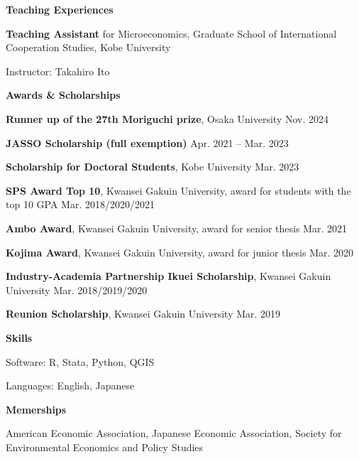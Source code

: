 \documentclass{article}
\begin{document}
\hrulefill

\begin{flushleft}
  \textbf{\large{Teaching Experiences}}
\end{flushleft}

\textbf{Teaching Assistant} for Microeconomics, Graduate School of International Cooperation Studies, Kobe University

Instructor: Takahiro Ito

\hrulefill

\begin{flushleft}
  \textbf{\large{Awards \& Scholarships}}
\end{flushleft}

\textbf{Runner up of the 27th Moriguchi prize}, Osaka University \hspace{\fill} Nov. 2024

\textbf{JASSO Scholarship (full exemption)} \hspace{\fill} Apr. 2021 -- Mar. 2023

\textbf{Scholarship for Doctoral Students}, Kobe University \hspace{\fill} Mar. 2023

\textbf{SPS Award Top 10}, Kwansei Gakuin University, award for students with the top 10 GPA \hspace{\fill} Mar. 2018/2020/2021

\textbf{Ambo Award}, Kwansei Gakuin University, award for senior thesis \hspace{\fill} Mar. 2021

\textbf{Kojima Award}, Kwansei Gakuin University, award for junior thesis \hspace{\fill} Mar. 2020

\textbf{Industry-Academia Partnership Ikuei Scholarship}, Kwansei Gakuin University \hspace{\fill} Mar. 2018/2019/2020

\textbf{Reunion Scholarship}, Kwansei Gakuin University \hspace{\fill} Mar. 2019

\hrulefill

\begin{flushleft}
  \textbf{\large{Skills}}
\end{flushleft}

Software: R, Stata, Python, QGIS

Languages: English, Japanese

\hrulefill

\begin{flushleft}
  \textbf{\large{Memerships}}
\end{flushleft}

American Economic Association, Japanese Economic Association, Society for Environmental Economics and Policy Studies
\end{document}
